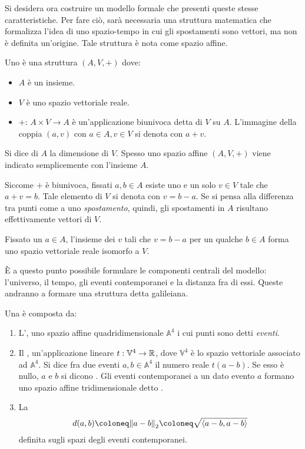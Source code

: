 Si desidera ora costruire un modello formale che presenti queste stesse caratteristiche. Per fare ciò, sarà necessaria una struttura matematica che formalizza l'idea di uno spazio-tempo in cui gli spostamenti sono vettori, ma non è definita un'origine. Tale struttura è nota come spazio affine.
\begin{definition}
  Uno  è una struttura $(A,V,+)$ dove:
  \begin{itemize}
    \item $A$ è un insieme.
    \item $V$ è uno spazio vettoriale reale.
    \item $+:\, A\times V \to A$ è un'applicazione biunivoca detta  di $V$ su $A$. L'immagine della coppia $(a,v)$ con $a \in  A, v \in V$ si denota con $a+v$.
  \end{itemize}
  Si dice  di $A$ la dimensione di $V$. Spesso uno spazio affine $(A, V, +)$ viene indicato semplicemente con l'insieme $A$.
\end{definition}
\begin{remark}
  Siccome $+$ è biunivoca, fissati $a,b \in A$ esiste uno e un solo $v \in V$ tale che $a + v = b$. Tale elemento di $V$ si denota con $v = b - a$. Se si pensa alla differenza tra punti come a uno \emph{spostamento}, quindi, gli spostamenti in $A$ risultano effettivamente vettori di $V$.
\end{remark}
\begin{remark}
Fissato un $a \in A$, l'insieme dei $v$ tali che $v = b - a$ per un qualche $b \in A$ forma uno spazio vettoriale reale isomorfo a $V$.
\end{remark}

È a questo punto possibile formulare le componenti centrali del modello: l'universo, il tempo, gli eventi contemporanei e la distanza fra di essi. Queste andranno a formare una struttura detta galileiana.
\begin{definition}
  Una  è composta da:
  \begin{enumerate}
    \item L', uno spazio affine quadridimensionale $\mathbb{A}^4$ i cui punti sono detti \emph{eventi}. 
    \item Il , un'applicazione lineare $t:\mathbb{V}^4 \to \mathbb{R}$, dove $\mathbb{V}^4$ è lo spazio vettoriale associato ad $\mathbb{A}^4$. Si dice  fra due eventi $a,b \in \mathbb{A}^4$ il numero reale $t(a-b)$. Se esso è nullo, $a$ e $b$ si dicono . Gli eventi contemporanei a un dato evento $a$ formano uno spazio affine tridimensionale detto .
    \item La  \begin{equation}
    d(a,b) \defeq \norm{a-b}_2 \defeq \sqrt{\ev{a-b,a-b}}  
    \end{equation}
    definita sugli spazi degli eventi contemporanei.
  \end{enumerate}
\end{definition}

